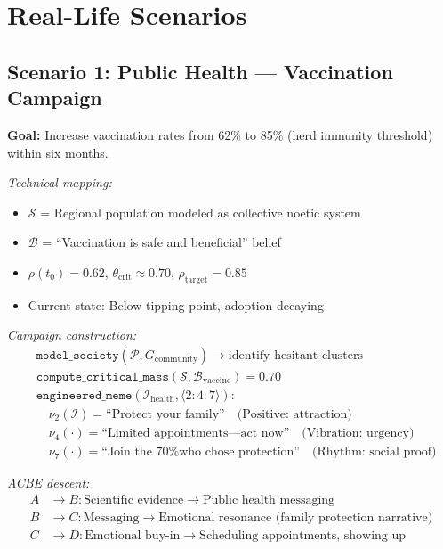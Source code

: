 \documentclass[11pt,twoside]{book}
\theoremstyle{definition}
\theoremstyle{plain}
\theoremstyle{remark}
\newcommand{\noe}[1]{\nu_{#1}}
\begin{document}
\chapter{Real-Life Scenarios}

\section{Scenario 1: Public Health --- Vaccination Campaign}

\begin{tcolorbox}[colback=yellow!5!white,colframe=yellow!65!black,title=\textbf{Scenario: Vaccination Campaign Design},breakable]

\textbf{Goal:} Increase vaccination rates from 62\% to 85\% (herd immunity threshold) within six months.

\textit{Technical mapping:}
\begin{itemize}
    \item $\mathcal{S}$ = Regional population modeled as collective noetic system
    \item $\mathcal{B}$ = ``Vaccination is safe and beneficial'' belief
    \item $\rho(t_0) = 0.62$, $\theta_{\mathrm{crit}} \approx 0.70$, $\rho_{\mathrm{target}} = 0.85$
    \item Current state: Below tipping point, adoption decaying
\end{itemize}

\textit{Campaign construction:}
\begin{align*}
    &\mathtt{model\_society}(\mathcal{P}, G_{\mathrm{community}}) \to \text{identify hesitant clusters} \\
    &\mathtt{compute\_critical\_mass}(\mathcal{S}, \mathcal{B}_{\mathrm{vaccine}}) = 0.70 \\
    &\mathtt{engineered\_meme}(\mathcal{I}_{\mathrm{health}}, \langle 2:4:7 \rangle): \\
    &\quad \noe{2}(\mathcal{I}) = \text{``Protect your family''} \quad \text{(Positive: attraction)} \\
    &\quad \noe{4}(\cdot) = \text{``Limited appointments---act now''} \quad \text{(Vibration: urgency)} \\
    &\quad \noe{7}(\cdot) = \text{``Join the 70\% who chose protection''} \quad \text{(Rhythm: social proof)}
\end{align*}

\textit{ACBE descent:}
\begin{align*}
    A &\to B: \text{Scientific evidence} \to \text{Public health messaging} \\
    B &\to C: \text{Messaging} \to \text{Emotional resonance (family protection narrative)} \\
    C &\to D: \text{Emotional buy-in} \to \text{Scheduling appointments, showing up}
\end{align*}


\end{tcolorbox}
\end{document}
